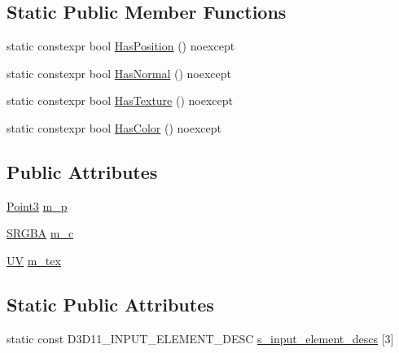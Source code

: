 \subsection*{Static Public Member Functions}
\begin{DoxyCompactItemize}
\item 
static constexpr bool \hyperlink{structmage_1_1rendering_1_1_vertex_position_color_texture_a7e63de3d06cc4d0a9fb3f32cde764c9c}{Has\+Position} () noexcept
\item 
static constexpr bool \hyperlink{structmage_1_1rendering_1_1_vertex_position_color_texture_a3823f3163d8350e4c448e99e90cc9436}{Has\+Normal} () noexcept
\item 
static constexpr bool \hyperlink{structmage_1_1rendering_1_1_vertex_position_color_texture_a679323396203b9b47a6ef4c936c72d58}{Has\+Texture} () noexcept
\item 
static constexpr bool \hyperlink{structmage_1_1rendering_1_1_vertex_position_color_texture_a1d3db6f6fb5a93ce596e7157fc204f81}{Has\+Color} () noexcept
\end{DoxyCompactItemize}
\subsection*{Public Attributes}
\begin{DoxyCompactItemize}
\item 
\hyperlink{structmage_1_1_point3}{Point3} \hyperlink{structmage_1_1rendering_1_1_vertex_position_color_texture_a924a25377182f6c29ff7f50fba08113c}{m\+\_\+p}
\item 
\hyperlink{structmage_1_1_s_r_g_b_a}{S\+R\+G\+BA} \hyperlink{structmage_1_1rendering_1_1_vertex_position_color_texture_a50b5c17d4a6f66e5d9be323f48a892c7}{m\+\_\+c}
\item 
\hyperlink{structmage_1_1_u_v}{UV} \hyperlink{structmage_1_1rendering_1_1_vertex_position_color_texture_a48cb88cc9c5d68350249e192152a7104}{m\+\_\+tex}
\end{DoxyCompactItemize}
\subsection*{Static Public Attributes}
\begin{DoxyCompactItemize}
\item 
static const D3\+D11\+\_\+\+I\+N\+P\+U\+T\+\_\+\+E\+L\+E\+M\+E\+N\+T\+\_\+\+D\+E\+SC \hyperlink{structmage_1_1rendering_1_1_vertex_position_color_texture_ac80470d80eea7ac62649bc9adb10ae07}{s\+\_\+input\+\_\+element\+\_\+descs} \mbox{[}3\mbox{]}
\end{DoxyCompactItemize}


